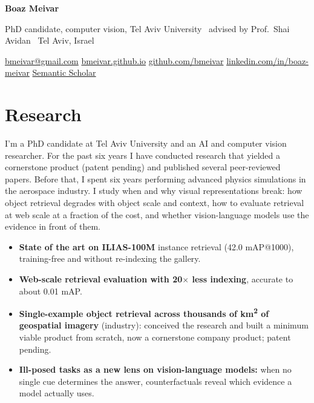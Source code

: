 \documentclass[10pt]{article}
\begin{document}
{\sffamily\bfseries\LARGE Boaz Meivar}\par\vspace{3pt}
{\small PhD candidate, computer vision, Tel Aviv University \textperiodcentered\ advised by Prof.\ Shai Avidan \textperiodcentered\ Tel Aviv, Israel}\par\vspace{2pt}
{\small\href{mailto:bmeivar@gmail.com}{bmeivar@gmail.com} \quad
\href{https://bmeivar.github.io}{bmeivar.github.io} \quad
\href{https://github.com/bmeivar}{github.com/bmeivar} \quad
\href{https://www.linkedin.com/in/boaz-meivar}{linkedin.com/in/boaz-meivar} \quad
\href{https://www.semanticscholar.org/author/2148726410}{Semantic Scholar}}

\section{Research}
I'm a PhD candidate at Tel Aviv University and an AI and computer vision researcher. For the past six years I have conducted research that yielded a cornerstone product (patent pending) and published several peer-reviewed papers. Before that, I spent six years performing advanced physics simulations in the aerospace industry. I study when and why visual representations break: how object retrieval degrades with object scale and context, how to evaluate retrieval at web scale at a fraction of the cost, and whether vision-language models use the evidence in front of them.

\vspace{4pt}{\sffamily\small\bfseries Highlights}
\begin{itemize}[leftmargin=1.2em,itemsep=1pt,topsep=2pt]
\item \textbf{State of the art on ILIAS-100M} instance retrieval (42.0 mAP@1000), training-free and without re-indexing the gallery.
\item \textbf{Web-scale retrieval evaluation with 20$\times$ less indexing}, accurate to about 0.01 mAP.
\item \textbf{Single-example object retrieval across thousands of km\textsuperscript{2} of geospatial imagery} (industry): conceived the research and built a minimum viable product from scratch, now a cornerstone company product; patent pending.
\item \textbf{Ill-posed tasks as a new lens on vision-language models:} when no single cue determines the answer, counterfactuals reveal which evidence a model actually uses.
\end{itemize}
\end{document}
